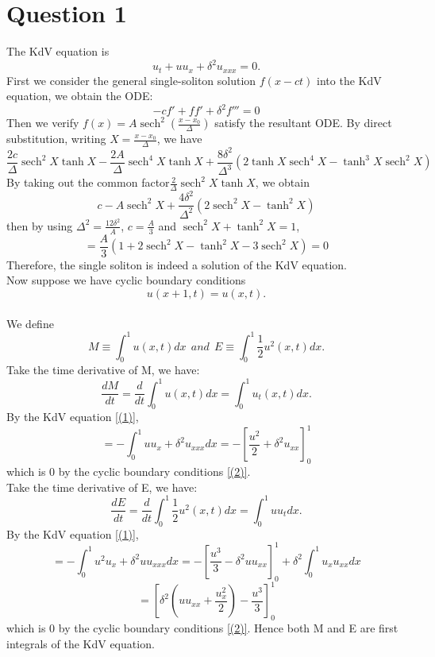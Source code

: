 \documentclass[a4paper,11pt]{article}
\DeclareMathOperator{\sech}{sech}
\begin{document}
\section{Question 1}
The KdV equation is 
\begin{equation}
u_t + uu_x + \delta^2u_{xxx} = 0.
\label{(1)}
\end{equation}
First we consider the general single-soliton solution $f(x-ct)$ into the KdV equation, we obtain the ODE: 
$$-cf'+ff'+\delta^2f''' = 0$$
Then we verify $f(x) = A{\sech}^2(\frac{x-x_0}{\Delta})$ satisfy the resultant ODE.
By direct substitution, writing $X = \frac{x-x_0}{\Delta}$, we have $$\frac{2c}{\Delta}{\sech}^2 X {\tanh} X -\frac{2A}{\Delta}{\sech}^4 X {\tanh}X +\frac{8\delta^2}{\Delta^3} (2\tanh X {\sech}^4 X-{\tanh}^3 X{\sech}^2 X)$$
By taking out the common factor$\frac{2}{\Delta}\sech^2 X \tanh X$, we obtain
$$ c-A\sech^2 X +\frac{4\delta^2}{\Delta^2} (2\sech^2 X - \tanh^2 X)$$
then by using $\Delta^2 = \frac{12\delta^2}{A}$, $c = \frac{A}{3}$ and $\sech^2 X + \tanh^2 X = 1$,  $$ =\frac{A}{3}(1+2\sech^2 X - \tanh^2 X-3\sech^2 X)  = 0$$
Therefore, the single soliton is indeed a solution of the KdV equation. \\
Now suppose we have cyclic boundary conditions 
\begin{equation}
u(x+1,t) = u(x,t). 
\label{(2)}
\end{equation}
\\We define $$M \equiv \int_{0}^{1} u(x,t) dx\ \ and\ \ E \equiv \int_{0}^{1} \frac{1}{2} u^2(x,t) dx. $$
Take the time derivative of M, we have:
$$\frac{dM}{dt} = \frac{d}{dt} \int_{0}^{1} u(x,t) dx= \int_{0}^{1} u_{t}(x,t) dx. $$ By the KdV equation \ref{(1)}, $$ = -\int_{0}^{1} uu_x + \delta^2u_{xxx} dx = -\left[\frac{u^2}{2}+\delta^2u_{xx}\right]_{0}^{1} $$
which is 0 by the cyclic boundary conditions \ref{(2)}. \\
Take the time derivative of E, we have:
$$\frac{dE}{dt} = \frac{d}{dt} \int_{0}^{1} \frac{1}{2}u^2(x,t) dx= \int_{0}^{1} uu_{t} dx. $$ By the KdV equation \ref{(1)}, $$ = -\int_{0}^{1} u^2 u_x + \delta^2uu_{xxx} dx = -\left[\frac{u^3}{3}-\delta^2uu_{xx}\right]_{0}^{1}+\delta^2\int_{0}^{1}u_xu_{xx}dx $$
$$= \left[\delta^2\left(uu_{xx}+\frac{u_x^2}{2}\right)-\frac{u^3}{3}\right]_{0}^{1}$$
which is 0 by the cyclic boundary conditions \ref{(2)}. 
Hence both M and E are first integrals of the KdV equation.
\end{document}
